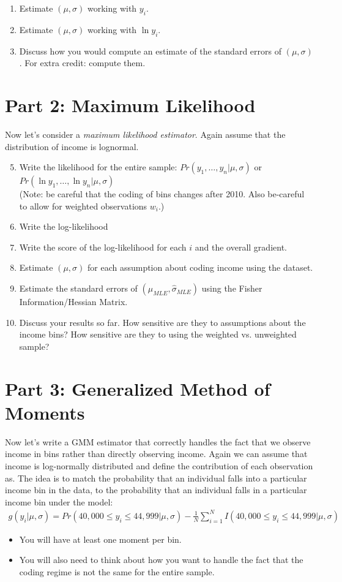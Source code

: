 \documentclass{article}
\begin{document}
\begin{enumerate}
\item Estimate $(\mu,\sigma)$ working with $y_i$.
\item Estimate $(\mu,\sigma)$ working with $\ln y_i$.
\item Discuss how you would compute an estimate of the standard errors of $(\mu,\sigma)$. For extra credit: compute them.
\end{enumerate}

\section*{\normalsize Part 2: Maximum Likelihood}

Now let's consider a \textit{maximum likelihood estimator}. Again assume that the distribution of income is lognormal. 
\begin{enumerate}
\setcounter{enumi}{4}
\item Write the likelihood for the entire sample:  $Pr(y_1,\ldots,y_n | \mu, \sigma)$ or $Pr(\ln y_1,\ldots, \ln y_n | \mu, \sigma)$ \\ (Note: be careful that the coding of bins changes after 2010. Also be-careful to allow for weighted observations $w_i$.)
\item Write the log-likelihood
\item Write the score of the log-likelihood for each $i$ and the overall gradient.
\item Estimate $(\mu,\sigma)$ for each assumption about coding income using the dataset.
\item Estimate the standard errors of $(\widehat{\mu}_{MLE},\widehat{\sigma}_{MLE})$ using the Fisher Information/Hessian Matrix.
\item Discuss your results so far. How sensitive are they to assumptions about the income bins? How sensitive are they to using the weighted vs. unweighted sample?
\end{enumerate}

\section*{\normalsize Part 3: Generalized Method of Moments}
Now let's write a GMM estimator that correctly handles the fact that we observe income in bins rather than directly observing income. Again we can assume that income is log-normally distributed and define the contribution of each observation as. The idea is to match the probability that an individual falls into a particular income bin in the data, to the probability that an individual falls in a particular income bin under the model:
\begin{align*}
g(y_i | \mu,\sigma) = Pr(40,000 \leq y_i \leq 44,999 | \mu,\sigma) -  \frac{1}{N}\sum_{i=1}^N I(40,000 \leq y_i \leq 44,999 | \mu,\sigma) 
\end{align*} 
\begin{itemize}
\item You will have at least one moment per bin.
\item You will also need to think about how you want to handle the fact that the coding regime is not the same for the entire sample.
\end{itemize}
\end{document}
